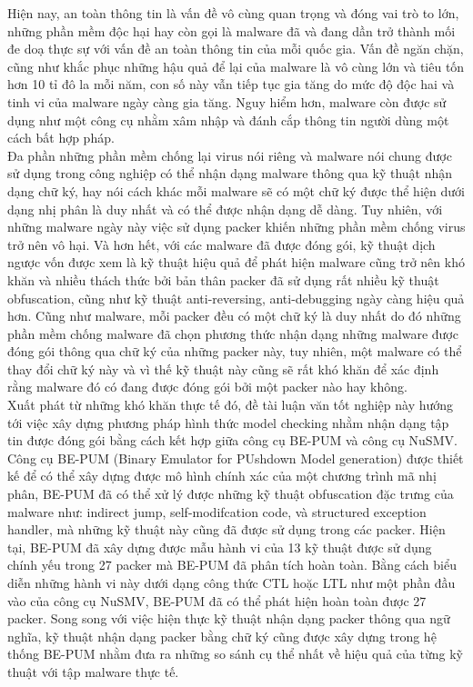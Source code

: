 \setlength\parindent{0pt}
\hspace{0.5cm}Hiện nay, an toàn thông tin là vấn đề vô cùng quan trọng và đóng vai trò to lớn, những phần mềm độc hại hay còn gọi là malware đã và đang dần trở thành mối đe doạ thực sự với vấn đề an toàn thông tin của mỗi quốc gia. Vấn đề ngăn chặn, cũng như khắc phục những hậu quả để lại của malware là vô cùng lớn và tiêu tốn hơn 10 tỉ đô la mỗi năm, con số này vẫn tiếp tục gia tăng do mức độ độc hai và tinh vi của malware ngày càng gia tăng. Nguy hiểm hơn, malware còn được sử dụng như một công cụ nhằm xâm nhập và đánh cắp thông tin người dùng một cách bất hợp pháp.\\  

\hspace{0.5cm}Đa phần những phần mềm chống lại virus nói riêng và malware nói chung được sử dụng trong công nghiệp có thể nhận dạng malware thông qua kỹ thuật nhận dạng chữ ký, hay nói cách khác mỗi malware sẽ có một chữ ký được thể hiện dưới dạng nhị phân là duy nhất và có thể được nhận dạng dễ dàng. Tuy nhiên, với những malware ngày này việc sử dụng packer khiến những phần mềm chống virus trở nên vô hại. Và hơn hết, với các malware đã được đóng gói, kỹ thuật dịch ngược vốn được xem là kỹ thuật hiệu quả để phát hiện malware cũng trở nên khó khăn và nhiều thách thức bởi bản thân packer đã sử dụng rất nhiều kỹ thuật obfuscation, cũng như kỹ thuật anti-reversing, anti-debugging ngày càng hiệu quả hơn. Cũng như malware, mỗi packer đều có một chữ ký là duy nhất do đó những phần mềm chống malware đã chọn phương thức nhận dạng những malware được đóng gói thông qua chữ ký của những packer này, tuy nhiên, một malware có thể thay đổi chữ ký này và vì thế kỹ thuật này cũng sẽ rất khó khăn để xác định rằng malware đó có đang được đóng gói bởi một packer nào hay không.\\

\hspace{0.5cm}Xuất phát từ những khó khăn thực tế đó, đề tài luận văn tốt nghiệp này hướng tới việc xây dựng phương pháp hình thức model checking nhằm nhận dạng tập tin được đóng gói bằng cách kết hợp giữa công cụ BE-PUM và công cụ NuSMV. Công cụ BE-PUM (Binary Emulator for PUshdown Model generation) được thiết kế để có thể xây dựng được mô hình chính xác của một chương trình mã nhị phân, BE-PUM đã có thể xử lý được những kỹ thuật obfuscation đặc trưng của malware như: indirect jump, self-modifcation code, và structured exception handler, mà những kỹ thuật này cũng đã được sử dụng trong các packer. Hiện tại, BE-PUM đã xây dựng được mẫu hành vi của 13 kỹ thuật được sử dụng chính yếu trong 27 packer mà BE-PUM đã phân tích hoàn toàn. Bằng cách biểu diễn những hành vi này dưới dạng công thức CTL hoặc LTL như một phần đầu vào của công cụ NuSMV, BE-PUM đã có thể phát hiện hoàn toàn được 27 packer. Song song với việc hiện thực kỹ thuật nhận dạng packer thông qua ngữ nghĩa, kỹ thuật nhận dạng packer bằng chữ ký cũng được xây dựng trong hệ thống BE-PUM nhằm đưa ra những so sánh cụ thể nhất về hiệu quả của từng kỹ thuật với tập malware thực tế.\\

